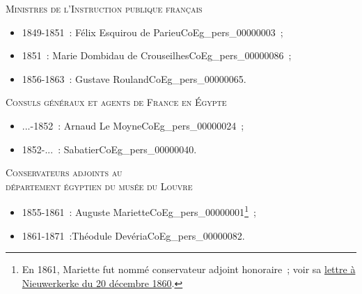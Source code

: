 \documentclass{book}
\begin{document}
\begin{center} \textsc{Ministres de l’Instruction publique français}\end{center} \begin{itemize}
\item 1849-1851~: Félix Esquirou de Parieu\gls{CoEg_pers_00000003}~;
\item 1851~: Marie Dombidau de Crouseilhes\gls{CoEg_pers_00000086}~;
\item 1856-1863~: Gustave Rouland\gls{CoEg_pers_00000065}. \end{itemize}

\begin{center} \textsc{Consuls généraux et agents de France en Égypte}\end{center} \begin{itemize}
\item ...-1852~: Arnaud Le Moyne\gls{CoEg_pers_00000024}~;
\item 1852-...~: Sabatier\gls{CoEg_pers_00000040}. \end{itemize}

\begin{center} \textsc{Conservateurs adjoints au\\
département égyptien du musée du Louvre}\end{center} \begin{itemize}
\item 1855-1861~: Auguste Mariette\gls{CoEg_pers_00000001}\footnote{En 1861, Mariette fut nommé conservateur adjoint honoraire~; voir sa \hyperlink{CoEg_Mariette_1860-12-20}{lettre à Nieuwerkerke du 20 décembre 1860}.}~;
\item 1861-1871~:Théodule Devéria\gls{CoEg_pers_00000082}. \end{itemize}

\cleardoublepage
{}
{}
\printnoidxglossary[type={hist}]

\cleardoublepage
{}
{}
\printnoidxglossary[type={myth}]

\cleardoublepage
{}
{}
\printnoidxglossary[type={boat}]

\cleardoublepage
{}
{}
\printnoidxglossary[type={org}]

\cleardoublepage
{}
{}
\printnoidxglossary[type={place}]
\end{document}
